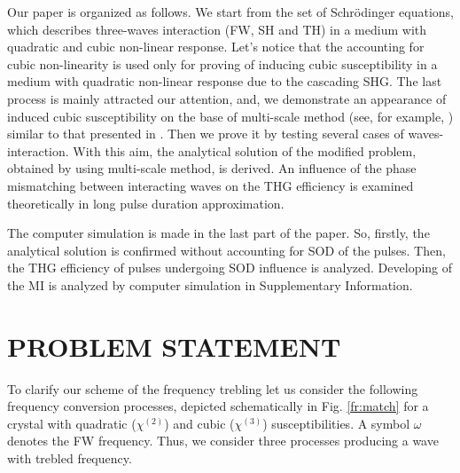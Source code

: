 \documentclass[a4paper, 12pt, onecolumn]{extarticle}
\begin{document}
Our paper is organized as follows. We start from the set of Schr\"{o}dinger equations, which describes three-waves  interaction (FW, SH and TH) in a medium with quadratic and cubic non-linear response. Let's notice that the accounting for cubic non-linearity is used only for proving of inducing  cubic susceptibility in a medium with quadratic non-linear response due to the cascading SHG. The last  process is mainly attracted our attention, and,  we demonstrate an appearance of induced  cubic susceptibility  on the base of multi-scale method (see, for example, \cite{bib:n24}) similar to that presented in \cite{bib:n19}. Then we prove it  by testing  several cases of waves-interaction.  With this aim, the analytical solution of the modified problem, obtained by using multi-scale method, is derived. An influence of the phase mismatching between interacting waves on the THG efficiency is examined  theoretically in long pulse duration approximation.

The computer simulation is made in the last part of the paper. So, firstly,  the analytical solution is confirmed without accounting for SOD of the pulses. Then, the THG efficiency  of pulses undergoing SOD  influence is analyzed. Developing of the MI is analyzed by computer simulation in Supplementary Information. 

\section*{PROBLEM STATEMENT}

To clarify our scheme of the frequency trebling let us consider the following frequency conversion processes, depicted schematically in Fig. \ref{fr:match} for a crystal with quadratic (\(\chi^{(2)}\)) and cubic (\(\chi^{(3)}\))  susceptibilities. A  symbol \(\omega\) denotes  the FW frequency. Thus, we consider three processes producing a wave with trebled frequency. 
\end{document}
